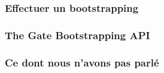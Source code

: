 \documentclass[11pt,xcolor={usenames,dvipsnames}]{beamer}
\begin{document}

\begin{frame} 
\frametitle{Effectuer un bootstrapping}
\end{frame} 


\begin{frame} 
\frametitle{The Gate Bootstrapping API}
\end{frame} 


\begin{frame}
\frametitle{Ce dont nous n'avons pas parlé}
\end{frame}

\end{document}
